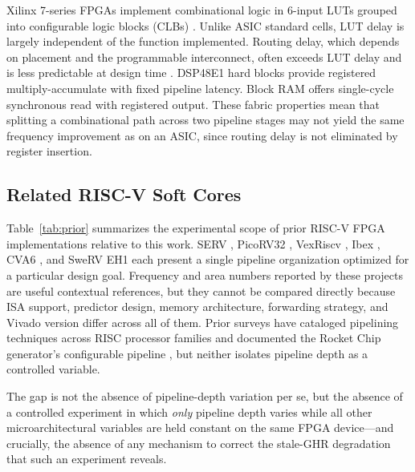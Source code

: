 \documentclass[journal]{IEEEtran}
\begin{document}
Xilinx 7-series FPGAs implement combinational logic in 6-input LUTs grouped into configurable logic blocks (CLBs) \cite{xilinx_7series}. Unlike ASIC standard cells, LUT delay is largely independent of the function implemented. Routing delay, which depends on placement and the programmable interconnect, often exceeds LUT delay and is less predictable at design time \cite{boutros2020fpga}. DSP48E1 hard blocks provide registered multiply-accumulate with fixed pipeline latency. Block RAM offers single-cycle synchronous read with registered output. These fabric properties mean that splitting a combinational path across two pipeline stages may not yield the same frequency improvement as on an ASIC, since routing delay is not eliminated by register insertion.

\subsection{Related RISC-V Soft Cores}

Table~\ref{tab:prior} summarizes the experimental scope of prior RISC-V FPGA implementations relative to this work. SERV \cite{serv2019}, PicoRV32 \cite{picorv32}, VexRiscv \cite{vexriscv}, Ibex \cite{schiavone2017slow}, CVA6 \cite{zaruba2019ariane}, and SweRV EH1 \cite{swerv2019} each present a single pipeline organization optimized for a particular design goal. Frequency and area numbers reported by these projects are useful contextual references, but they cannot be compared directly because ISA support, predictor design, memory architecture, forwarding strategy, and Vivado version differ across all of them. Prior surveys have cataloged pipelining techniques across RISC processor families \cite{biglari2019pipelining} and documented the Rocket Chip generator's configurable pipeline \cite{asanovic2016rocket}, but neither isolates pipeline depth as a controlled variable.

The gap is not the absence of pipeline-depth variation per se, but the absence of a controlled experiment in which \emph{only} pipeline depth varies while all other microarchitectural variables are held constant on the same FPGA device---and crucially, the absence of any mechanism to correct the stale-GHR degradation that such an experiment reveals.
\end{document}
